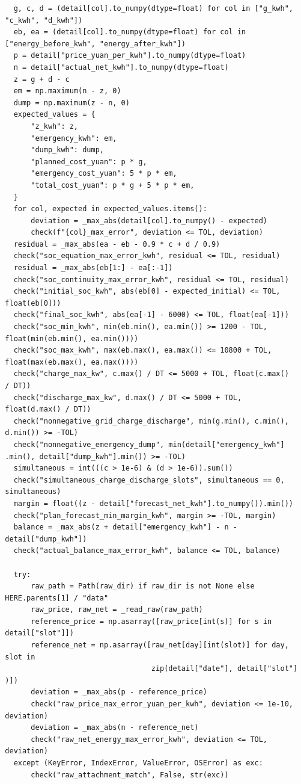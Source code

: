 \begin{verbatim}
    g, c, d = (detail[col].to_numpy(dtype=float) for col in ["g_kwh",
  "c_kwh", "d_kwh"])
    eb, ea = (detail[col].to_numpy(dtype=float) for col in
  ["energy_before_kwh", "energy_after_kwh"])
    p = detail["price_yuan_per_kwh"].to_numpy(dtype=float)
    n = detail["actual_net_kwh"].to_numpy(dtype=float)
    z = g + d - c
    em = np.maximum(n - z, 0)
    dump = np.maximum(z - n, 0)
    expected_values = {
        "z_kwh": z,
        "emergency_kwh": em,
        "dump_kwh": dump,
        "planned_cost_yuan": p * g,
        "emergency_cost_yuan": 5 * p * em,
        "total_cost_yuan": p * g + 5 * p * em,
    }
    for col, expected in expected_values.items():
        deviation = _max_abs(detail[col].to_numpy() - expected)
        check(f"{col}_max_error", deviation <= TOL, deviation)
    residual = _max_abs(ea - eb - 0.9 * c + d / 0.9)
    check("soc_equation_max_error_kwh", residual <= TOL, residual)
    residual = _max_abs(eb[1:] - ea[:-1])
    check("soc_continuity_max_error_kwh", residual <= TOL, residual)
    check("initial_soc_kwh", abs(eb[0] - expected_initial) <= TOL,
  float(eb[0]))
    check("final_soc_kwh", abs(ea[-1] - 6000) <= TOL, float(ea[-1]))
    check("soc_min_kwh", min(eb.min(), ea.min()) >= 1200 - TOL,
  float(min(eb.min(), ea.min())))
    check("soc_max_kwh", max(eb.max(), ea.max()) <= 10800 + TOL,
  float(max(eb.max(), ea.max())))
    check("charge_max_kw", c.max() / DT <= 5000 + TOL, float(c.max()
  / DT))
    check("discharge_max_kw", d.max() / DT <= 5000 + TOL,
  float(d.max() / DT))
    check("nonnegative_grid_charge_discharge", min(g.min(), c.min(),
  d.min()) >= -TOL)
    check("nonnegative_emergency_dump", min(detail["emergency_kwh"]
  .min(), detail["dump_kwh"].min()) >= -TOL)
    simultaneous = int(((c > 1e-6) & (d > 1e-6)).sum())
    check("simultaneous_charge_discharge_slots", simultaneous == 0,
  simultaneous)
    margin = float((z - detail["forecast_net_kwh"].to_numpy()).min())
    check("plan_forecast_min_margin_kwh", margin >= -TOL, margin)
    balance = _max_abs(z + detail["emergency_kwh"] - n -
  detail["dump_kwh"])
    check("actual_balance_max_error_kwh", balance <= TOL, balance)

    try:
        raw_path = Path(raw_dir) if raw_dir is not None else
  HERE.parents[1] / "data"
        raw_price, raw_net = _read_raw(raw_path)
        reference_price = np.asarray([raw_price[int(s)] for s in
  detail["slot"]])
        reference_net = np.asarray([raw_net[day][int(slot)] for day,
  slot in
                                    zip(detail["date"], detail["slot"]
  )])
        deviation = _max_abs(p - reference_price)
        check("raw_price_max_error_yuan_per_kwh", deviation <= 1e-10,
  deviation)
        deviation = _max_abs(n - reference_net)
        check("raw_net_energy_max_error_kwh", deviation <= TOL,
  deviation)
    except (KeyError, IndexError, ValueError, OSError) as exc:
        check("raw_attachment_match", False, str(exc))


\end{verbatim}
